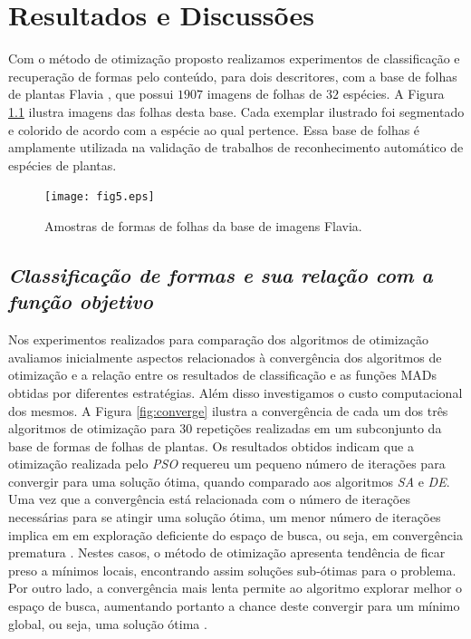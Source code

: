 
\chapter{Resultados e Discussões \label{chap:resultados}}


Com o método de otimização proposto realizamos experimentos de classificação e recuperação de formas pelo conteúdo, para dois descritores, com a base de folhas de plantas Flavia \cite{4458016},  que possui $1907$ imagens de folhas de $32$ espécies. A Figura \ref{fig:bases} ilustra imagens das folhas desta base. Cada exemplar ilustrado foi segmentado e colorido de acordo com a espécie ao qual pertence. Essa base de folhas é amplamente utilizada na validação de trabalhos de reconhecimento automático de espécies de plantas. 

\begin{figure}[!htb]
\caption{\label{fig:bases}Amostras de formas de folhas da base de imagens Flavia.}

\centering
\texttt{[image: fig5.eps]}
\end{figure}




\section{\emph{Classificação de formas e sua relação com  a função objetivo}}
Nos experimentos realizados para comparação dos algoritmos de otimização avaliamos inicialmente aspectos  relacionados à  convergência dos algoritmos de otimização e a relação entre os resultados de classificação e as funções MADs obtidas por diferentes estratégias. Além disso investigamos o custo computacional dos mesmos. A Figura \ref{fig:converge} ilustra a convergência de cada um dos três algoritmos de otimização para $30$ repetições realizadas em um subconjunto da base de formas de folhas de plantas. Os resultados obtidos indicam que a otimização realizada pelo \emph{PSO} requereu um pequeno número de iterações para convergir para uma solução ótima, quando comparado aos algoritmos \emph{SA} e \emph{DE}. Uma vez que a convergência está relacionada com o número de iterações necessárias para se atingir uma solução ótima, um menor número de iterações implica em em exploração deficiente do espaço de busca, ou seja, em convergência prematura . Nestes casos, o método de otimização apresenta tendência de ficar preso a mínimos locais, encontrando assim soluções sub-ótimas para o problema. Por outro lado, a convergência mais lenta permite ao algoritmo explorar melhor o espaço de busca, aumentando portanto a chance deste convergir para um mínimo global, ou seja, uma solução ótima .
 
